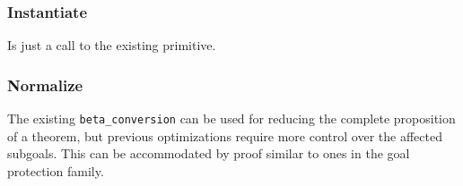 \subsubsection{Instantiate} Is just a call to the existing primitive.
\subsubsection{Normalize} The existing \texttt{beta\_conversion} can be used for reducing the complete proposition of a theorem, but previous optimizations require more control over the affected subgoals. This can be accommodated by proof similar to ones in the goal protection family.